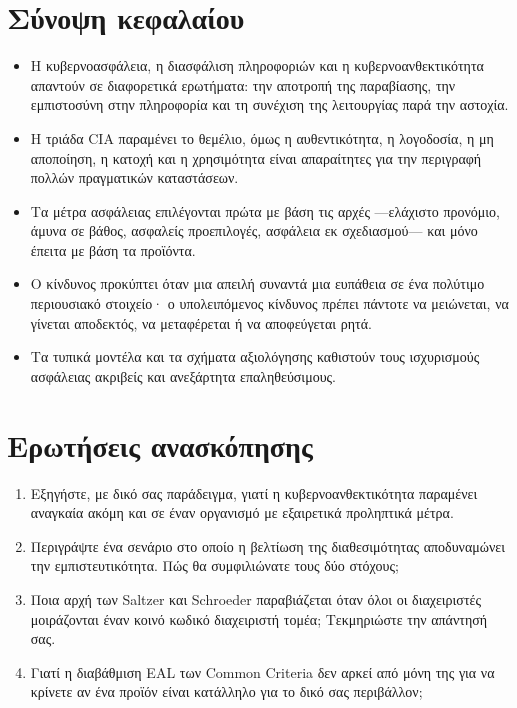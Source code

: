 \section*{Σύνοψη κεφαλαίου}
\begin{itemize}
  \item Η κυβερνοασφάλεια, η διασφάλιση πληροφοριών και η κυβερνοανθεκτικότητα απαντούν σε διαφορετικά ερωτήματα: την αποτροπή της παραβίασης, την εμπιστοσύνη στην πληροφορία και τη συνέχιση της λειτουργίας παρά την αστοχία.
  \item Η τριάδα CIA παραμένει το θεμέλιο, όμως η αυθεντικότητα, η λογοδοσία, η μη αποποίηση, η κατοχή και η χρησιμότητα είναι απαραίτητες για την περιγραφή πολλών πραγματικών καταστάσεων.
  \item Τα μέτρα ασφάλειας επιλέγονται πρώτα με βάση τις αρχές —ελάχιστο προνόμιο, άμυνα σε βάθος, ασφαλείς προεπιλογές, ασφάλεια εκ σχεδιασμού— και μόνο έπειτα με βάση τα προϊόντα.
  \item Ο κίνδυνος προκύπτει όταν μια απειλή συναντά μια ευπάθεια σε ένα πολύτιμο περιουσιακό στοιχείο· ο υπολειπόμενος κίνδυνος πρέπει πάντοτε να μειώνεται, να γίνεται αποδεκτός, να μεταφέρεται ή να αποφεύγεται ρητά.
  \item Τα τυπικά μοντέλα και τα σχήματα αξιολόγησης καθιστούν τους ισχυρισμούς ασφάλειας ακριβείς και ανεξάρτητα επαληθεύσιμους.
\end{itemize}

\section*{Ερωτήσεις ανασκόπησης}
\begin{enumerate}
  \item Εξηγήστε, με δικό σας παράδειγμα, γιατί η κυβερνοανθεκτικότητα παραμένει αναγκαία ακόμη και σε έναν οργανισμό με εξαιρετικά προληπτικά μέτρα.
  \item Περιγράψτε ένα σενάριο στο οποίο η βελτίωση της διαθεσιμότητας αποδυναμώνει την εμπιστευτικότητα. Πώς θα συμφιλιώνατε τους δύο στόχους;
  \item Ποια αρχή των Saltzer και Schroeder παραβιάζεται όταν όλοι οι διαχειριστές μοιράζονται έναν κοινό κωδικό διαχειριστή τομέα; Τεκμηριώστε την απάντησή σας.
  \item Γιατί η διαβάθμιση EAL των Common Criteria δεν αρκεί από μόνη της για να κρίνετε αν ένα προϊόν είναι κατάλληλο για το δικό σας περιβάλλον;
\end{enumerate}
